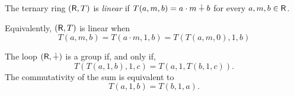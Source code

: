 \begin{defn}\label{defn:linear}
    The ternary ring $(\mathsf R,T)$ is \textsl{linear} if $T(a,m,b)=a\cdot m\dotplus b$ for every $a,m,b\in\mathsf R$.
\end{defn}

\begin{rem}\label{rem:linear-ternary-ring}
    Equivalently, $(\mathsf R,T)$ is linear when
    \[
        T(a,m,b)=T(a\cdot m,1,b)=T(T(a,m,0),1,b)
    \]
\end{rem}

\begin{rem}\label{rem:ternary-sum-group}
    The loop $(\mathsf R,\dotplus)$ is a group if, and only if,
    \[
        T(T(a,1,b),1,c) = T(a,1,T(b,1,c)).
    \]
    The commutativity of the sum is equivalent to
    \[
        T(a,1,b)=T(b,1,a).
    \]
\end{rem}

